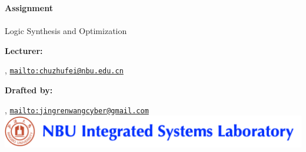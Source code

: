 


\usepackage{todonotes}




\begin{titlepage}
\begin{Large}
    \textsf{\textbf{Assignment}}\\ \\
Logic Synthesis and Optimization
\end{Large}

\vspace{1ex}

\textsf{\textbf{Lecturer:}} 

, \href{mailto:chuzhufei@nbu.edu.cn}{\texttt{mailto:chuzhufei@nbu.edu.cn}}

\textsf{\textbf{Drafted by:}} 


, \href{mailto:jingrenwangcyber@gmail.com}{\texttt{mailto:jingrenwangcyber@gmail.com}}
\vspace*{2\baselineskip}\\

\vspace{2ex}
\vfill
\includegraphics[scale=0.7]{Graphics/lab-logo.png}
\end{titlepage}


\newpage

\newpage

\newpage
\vfill





